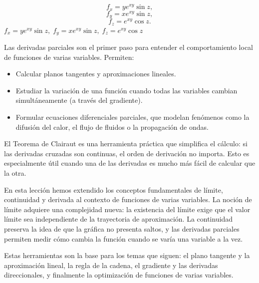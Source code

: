 \begin{myproof}
\[
f_x = y e^{xy}\sin z,
\]
\[
f_y = x e^{xy}\sin z,
\]
\[
f_z = e^{xy}\cos z.
\]
$\boxed{f_x=ye^{xy}\sin z,\; f_y=xe^{xy}\sin z,\; f_z=e^{xy}\cos z}$
\end{myproof}


Las derivadas parciales son el primer paso para entender el
comportamiento local de funciones de varias variables. Permiten:
\begin{itemize}
    \item Calcular planos tangentes y aproximaciones lineales.
    \item Estudiar la variación de una función cuando todas las
    variables cambian simultáneamente (a través del gradiente).
    \item Formular ecuaciones diferenciales parciales, que modelan
    fenómenos como la difusión del calor, el flujo de fluidos o la
    propagación de ondas.
\end{itemize}

\begin{rem}
El Teorema de Clairaut es una herramienta práctica que simplifica el
cálculo: si las derivadas cruzadas son continuas, el orden de
derivación no importa. Esto es especialmente útil cuando una de las
derivadas es mucho más fácil de calcular que la otra.
\end{rem}


En esta lección hemos extendido los conceptos fundamentales de
límite, continuidad y derivada al contexto de funciones de varias
variables. La noción de límite adquiere una complejidad nueva: la
existencia del límite exige que el valor límite sea independiente de
la trayectoria de aproximación. La continuidad preserva la idea de
que la gráfica no presenta saltos, y las derivadas parciales permiten
medir cómo cambia la función cuando se varía una variable a la vez.

Estas herramientas son la base para los temas que siguen: el plano
tangente y la aproximación lineal, la regla de la cadena, el
gradiente y las derivadas direccionales, y finalmente la optimización
de funciones de varias variables.

